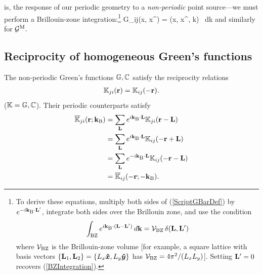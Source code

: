 \documentclass[letterpaper]{article}
\begin{document}
is, the response of our periodic geometry to a \textit{non-periodic}
point source---we must perform a Brillouin-zone 
integration:\footnote{To derive these equations, multiply both sides
of (\ref{ScriptGBarDef}) by $e^{-i\mathbf{k}_{\text{\scriptsize B}} \cdot \mathbf{L}^\prime}$,
integrate both sides over the Brillouin zone, and use the
condition 
$$\int_{\text{\scriptsize BZ}} e^{i\mathbf{k}_{\text{\scriptsize B}}\cdot (\mathbf{L}-\mathbf{L}^\prime)}\,d\mathbf{k}
  =\mathcal{V}_{\text{\scriptsize BZ}} \, \delta(\mathbf{L},\mathbf{L}^\prime)
$$
where $\mathcal{V}_{\text{\scriptsize BZ}}$ is the Brillouin-zone volume [for example,
a square lattice with basis vectors
$\{\mathbf{L}_1, \mathbf{L}_2\}=\{L_x\boldsymbol{\hat{x}}, L_y\boldsymbol{\hat{y}}\}$ has
$\mathcal{V}_{\text{\scriptsize BZ}}=4\pi^2/(L_x L_y)$].
Setting $\mathbf{L}^\prime=0$ recovers (\ref{BZIntegration}).}
{
  \mc G_{ij}(\vb x, \vb x^\prime)
 = 
   \int{} 
   (\vb x, \vb x^\prime, \vb k)
   \, d\vb k
}
and similarly for $\mathcal{G}^{\text{\scriptsize M}}.$

\subsection*{Reciprocity of homogeneous Green's functions}

The non-periodic Green's functions $\mathbb{G}, \mathbb{C}$ 
satisfy the reciprocity relations
\begin{align*}
  \mathbb{K}_{ji}(\mathbf{r}) = \mathbb{K}_{ij}(-\mathbf{r}).
\end{align*}
($\mathbb{K}=\mathbb{G},\mathbb{C}$). Their periodic counterparts satisfy
\begin{align*}
 \overline{\mathbb{K}}_{ji}(\mathbf{r}; \mathbf{k}_{\text{\scriptsize B}})
 &= \sum_{\mathbf{L}} e^{i\mathbf{k}_{\text{\scriptsize B}}\cdot \mathbf{L}}
    \mathbb{K}_{ji}(\mathbf{r} - \mathbf{L})
\\
 &= \sum_{\mathbf{L}} e^{i\mathbf{k}_{\text{\scriptsize B}}\cdot \mathbf{L}}
    \mathbb{K}_{ij}(-\mathbf{r} + \mathbf{L})
\\
 &= \sum_{\mathbf{L}} e^{-i\mathbf{k}_{\text{\scriptsize B}}\cdot \mathbf{L}}
    \mathbb{K}_{ij}(-\mathbf{r} - \mathbf{L})
\\
 &= \overline{\mathbb{K}}_{ij}(-\mathbf{r}; -\mathbf{k}_{\text{\scriptsize B}}).
\end{align*}
\end{document}
